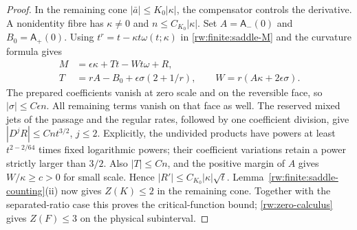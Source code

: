 \begin{proof}
In the remaining cone $|\bar a|\le K_0|\kappa|$, the compensator
controls the derivative. A nonidentity fibre has $\kappa\ne0$ and
$n\le C_{K_0}|\kappa|$.
Set $A=\mathsf A_-(0)$ and $B_0=\mathsf A_+(0)$. Using
$t^r=t-\kappa t\omega(t;\kappa)$ in
\eqref{rw:finite:saddle-M} and the curvature formula gives
\begin{equation}\label{rw:finite:saddle-compensator}
\begin{aligned}
 M&=\epsilon\kappa+Tt-Wt\omega+R,\\
 T&=rA-B_0+\epsilon\sigma(2+1/r),\qquad
 W=r(A\kappa+2\epsilon\sigma).
\end{aligned}
\end{equation}
The prepared coefficients vanish at zero scale and on the reversible
face, so $|\sigma|\le C\epsilon n$.
All remaining terms vanish on that face as well. The reserved mixed
jets of the passage and the regular rates, followed by one coefficient
division, give $|D^jR|\le Cnt^{3/2}$, $j\le2$.
Explicitly, the undivided products have powers at least
$t^{2-2/64}$ times fixed logarithmic powers; their coefficient
variations retain a power strictly larger than $3/2$.
Also $|T|\le Cn$, and the positive margin of $A$ gives
$W/\kappa\ge c>0$ for small scale. Hence
$|R'|\le C_{K_0}|\kappa|\sqrt t$.
Lemma~\ref{rw:finite:saddle-counting}\textup{(ii)} now gives
$Z(K)\le2$ in the remaining cone. Together with the separated-ratio
case this proves the critical-function bound; \ref{rw:zero-calculus}
gives $Z(F)\le3$ on the physical subinterval.
\end{proof}


